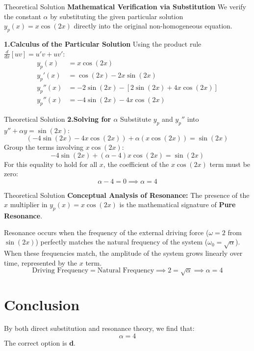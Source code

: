 \documentclass{beamer}
\begin{document}
\begin{frame}{Theoretical Solution}
\textbf{Mathematical Verification via Substitution}
We verify the constant $\alpha$ by substituting the given particular solution $y_p(x) = x\cos(2x)$ directly into the original non-homogeneous equation.

\textbf{1.Calculus of the Particular Solution}
Using the product rule $\frac{d}{dx}[uv] = u'v + uv'$:
\begin{align*}
    y_p(x) &= x\cos(2x) \\
    y_p'(x) &= \cos(2x) - 2x\sin(2x) \\
    y_p''(x) &= -2\sin(2x) - [2\sin(2x) + 4x\cos(2x)] \\
    y_p''(x) &= -4\sin(2x) - 4x\cos(2x)
\end{align*}

\end{frame}

\begin{frame}{Theoretical Solution}
\textbf{2.Solving for $\alpha$}
Substitute $y_p$ and $y_p''$ into $y'' + \alpha y = \sin(2x)$:
\begin{equation*}
    (-4\sin(2x) - 4x\cos(2x)) + \alpha(x\cos(2x)) = \sin(2x)
\end{equation*}
Group the terms involving $x\cos(2x)$:
\begin{equation*}
    -4\sin(2x) + (\alpha - 4)x\cos(2x) = \sin(2x)
\end{equation*}
For this equality to hold for all $x$, the coefficient of the $x\cos(2x)$ term must be zero:
\begin{equation*}
    \alpha - 4 = 0 \implies \alpha = 4
\end{equation*}    
\end{frame}

\begin{frame}{Theoretical Solution}
\textbf{Conceptual Analysis of Resonance:}
The presence of the $x$ multiplier in $y_p(x) = x\cos(2x)$ is the mathematical signature of \textbf{Pure Resonance}. 



Resonance occurs when the frequency of the external driving force ($\omega = 2$ from $\sin(2x)$) perfectly matches the natural frequency of the system ($\omega_0 = \sqrt{\alpha}$). When these frequencies match, the amplitude of the system grows linearly over time, represented by the $x$ term.
\begin{equation*}
    \text{Driving Frequency} = \text{Natural Frequency} \implies 2 = \sqrt{\alpha} \implies \alpha = 4
\end{equation*}

\section{Conclusion}
By both direct substitution and resonance theory, we find that:
\begin{equation*}
    \alpha = 4
\end{equation*}
The correct option is \textbf{d}.

\end{frame}
\end{document}
